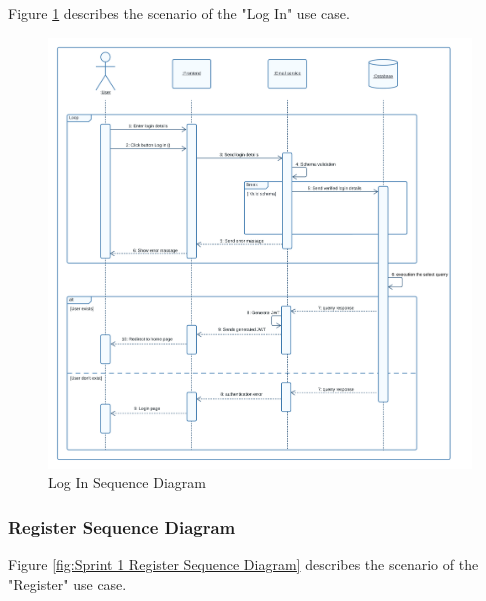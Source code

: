 Figure \ref{fig:Sprint 1 Login Sequence Diagram} describes the scenario of the "Log In" use case.

\begin{figure}[ht]
	\centering
	\includegraphics[width=\linewidth]{Images/Sprint1/sequence diagram sprint 1/auth v1.png}
	\caption{ Log In Sequence Diagram}
	\label{fig:Sprint 1 Login Sequence Diagram}
\end{figure}

\clearpage

\subsubsection{Register Sequence Diagram}

Figure \ref{fig:Sprint 1 Register Sequence Diagram} describes the scenario of the "Register" use case.

